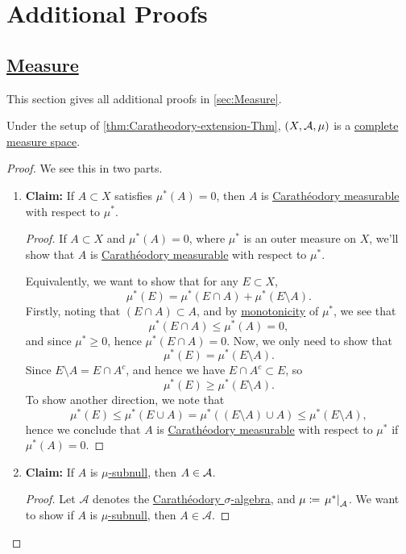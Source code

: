 \section{Additional Proofs}\label{Apx:Additional-Proofs}
\subsection{\hyperref[sec:Measure]{Measure}}
This section gives all additional proofs in \autoref{sec:Measure}.
\begin{theorem}\label{thm:Caratheodory-extension-Thm:3.}
	Under the setup of \autoref{thm:Caratheodory-extension-Thm}, \((X, \mathcal{\MakeUppercase{a}} , \mu )\) is a \hyperref[def:complete-measure-space]{complete measure space}.
\end{theorem}
\begin{proof}
	We see this in two parts.
	\begin{enumerate}
		\item \textbf{Claim:} If \(A\subset X\) satisfies \(\mu ^{*} (A) = 0\), then \(A\) is \hyperref[def:C-measurable]{Carathéodory measurable} with respect to \(\mu ^{*} \).
		      \begin{proof}
			      If \(A\subset X\) and \(\mu^{*} (A) = 0\), where \(\mu^{*} \) is an outer measure on \(X\), we'll show that \(A\) is \hyperref[def:C-measurable]{Carathéodory measurable}
			      with respect to \(\mu^{*} \).

			      \par Equivalently, we want to show that for any \(E\subset X\),
			      \[
				      \mu^{*} (E) = \mu^{*} (E\cap A) + \mu^{*} (E \setminus A).
			      \]
			      Firstly, noting that \((E\cap A)\subset A\), and by \hyperref[def:outer-measure-montonicity]{monotonicity} of \(\mu^{*} \), we see that
			      \[
				      \mu^{*} (E\cap A)\leq \mu^{*} (A) = 0,
			      \]
			      and since \(\mu^{*} \geq 0\), hence \(\mu^{*} (E\cap A) = 0\). Now, we only need to show that
			      \[
				      \mu^{*} (E) = \mu^{*} (E\setminus A).
			      \]
			      Since \(E\setminus A = E\cap A^{c} \), and hence we have \(E\cap A^{c} \subset E\), so
			      \[
				      \mu^{*} (E)\geq \mu^{*} (E\setminus A).
			      \]
			      To show another direction, we note that
			      \[
				      \mu^{*} (E)\leq \mu^{*} (E\cup A) = \mu^{*} ((E\setminus A) \cup A) \leq \mu^{*} (E\setminus A),
			      \]
			      hence we conclude that \(A\) is \hyperref[def:C-measurable]{Carathéodory measurable} with respect to \(\mu^{*} \) if \(\mu^{*} (A)=0\).
		      \end{proof}
		\item \textbf{Claim:} If \(A\) is \hyperref[def:mu-subnull-set]{\(\mu\)-subnull}, then \(A\in \mathcal{\MakeUppercase{a}} \).
		      \begin{proof}
			      Let \(\mathcal{A} \) denotes the \hyperref[thm:Caratheodory-extension-Thm]{Carathéodory \(\sigma\)-algebra}, and \(\mu\coloneqq \left.\mu^{*} \right\vert_{\mathcal{A} }^{} \). We want to show if
			      \(A\) is \hyperref[def:mu-subnull-set]{\(\mu\)-subnull}, then \(A\in\mathcal{A} \).


\end{proof}
\end{enumerate}
\end{proof}
